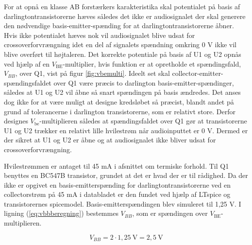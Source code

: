 For at opnå en klasse AB forstærkers karakteristika skal potentialet på basis af darlingtontransistorerne hæves således det ikke er audiosignalet der skal generere den nødvendige basis-emitter-spænding for at darlingtontransistorerne åbner. Hvis ikke potentialet hæves nok vil audiosignalet blive udsat for crossoverforvrængning idet en del af signalets spændning omkring 0 V ikke vil blive overført til højtaleren. Det korrekte potentiale på basis af U1 og U2 opnås ved hjælp af en $V_\mathrm{BE}$-multiplier, hvis funktion er at opretholde et spændingsfald, $V_{BB}$, over Q1, vist på figur \ref{fig:vbemulti}. Ideelt set skal collector-emitter-spændingsfaldet over Q1 være præcis to darlington basis-emitter-spændinger, således at U1 og U2 vil åbne så snart spændingen på basis ændredes. Det anses dog ikke for at være muligt at designe kredsløbet så præcist, blandt andet på grund af tolerancerne i darlington transistorerne, som er relativt store. Derfor designes $V_\mathrm{be}$-multiplieren således at spændingsfaldet over Q1 gør at transistorerne U1 og U2 trækker en relativt lille hvilestrøm når audioinputtet er 0 V. Dermed er der sikret at U1 og U2 er åbne og at audiosignalet ikke bliver udsat for crossoverforvrængning. 


Hvilestrømmen er antaget til 45 mA i afsnittet om termiske forhold. Til Q1 benyttes en BC547B transistor, grundet at det er hvad der er til rådighed. Da der ikke er opgivet en basis-emitterspænding for darlingtontransistorerne ved en collectorstrøm på 45 mA i databladet \cite{bdx33-34-datablad} er den fundet ved hjælp af LTspice og transistorernes spicemodel. Basis-emitterspændingen blev simuleret til 1,25 V. I ligning (\ref{eq:vbbberegning}) bestemmes $V_{BB}$, som er spændingen over $V_\mathrm{BE}$-multiplieren.

\begin{equation}
V_{BB} =2 \cdot 1,25~\mathrm{V} = 2,5~\mathrm{V}
\label{eq:vbbberegning}
\end{equation}

